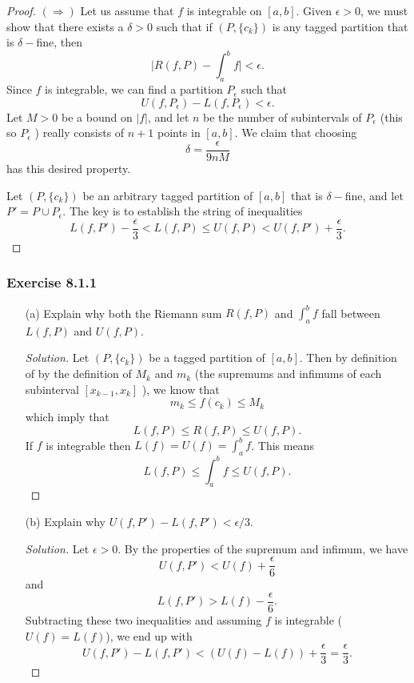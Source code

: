 \begin{proof}
    \( (\Rightarrow)  \) Let us assume that \( f  \) is integrable on \( [a,b]  \). Given \( \epsilon > 0  \), we must show that there exists a \( \delta > 0  \) such that if \( ( P, \{ c_{k } \} ) \) is any tagged partition that is \( \delta- \)fine, then 
    \[  \Big| R(f,P) - \int_{ a }^{ b } f  \Big| < \epsilon. \]
    Since \( f  \) is integrable, we can find a partition \( P_{\epsilon } \) such that 
    \[  U(f, P_{\epsilon }) - L(f, P_{\epsilon })  < \epsilon. \] Let \( M > 0  \) be a bound on \( | f |  \), and let \( n  \) be the number of subintervals of \( P_{\epsilon } \) (this so \( P_{\epsilon }\) ) really consists of \( n + 1  \) points in \( [a,b]  \). We claim that choosing 
    \[  \delta = \frac{ \epsilon  }{ 9nM }  \] has this desired property. 

    Let \( (P, \{ c_{k}    \} ) \) be an arbitrary tagged partition of \( [a,b]  \) that is \( \delta- \)fine, and let \( P' = P \cup P_{\epsilon } \). The key is to establish the string of inequalities 
    \[  L(f,P') - \frac{ \epsilon  }{ 3 }  < L(f,P ) \leq U(f,P) < U(f,P') + \frac{ \epsilon  }{ 3 }.\]
\end{proof}

\subsubsection{Exercise 8.1.1} 
\begin{enumerate}
    \item[(a)] Explain why both the Riemann sum \( R(f,P)  \) and \( \int_{ a }^{ b } f  \) fall between \( L(f,P)  \) and \( U(f,P)  \). 
        \begin{proof}[Solution]
            Let \( (P, \{ c_{k }  \} ) \) be a tagged partition of \( [a,b]  \). Then by definition of by the definition of \( M_{k }  \)  and \( m_{k }   \) (the supremums and infimums  of each subinterval \( [x_{k-1} , x_{k }] \) ), we know that 
            \[  m_{ k } \leq f(c_{ k }  )  \leq M_{k } \] which imply that 
            \[ L(f,P) \leq R(f,P) \leq U(f,P). \]
            If \( f  \) is integrable then \( L(f) = U(f) = \int_{ a }^{ b } f   \). This means 
            \[ L(f,P) \leq \int_{ a }^{ b } f \leq U(f,P).\]
        \end{proof}
        \item[(b)] Explain why \( U(f,P') - L(f, P') < \epsilon / 3.  \)
            \begin{proof}[Solution]
           Let \( \epsilon > 0  \). By the properties of the supremum and infimum, we have 
            \[ U(f,P') < U(f) + \frac{ \epsilon  }{ 6 } \] and 
            \[  L(f,P') > L(f) - \frac{ \epsilon  }{ 6 }. \] Subtracting these two inequalities and assuming \( f  \) is integrable (\( U(f) = L(f) \)), we end up with 
            \[  U(f,P') - L(f,P') < (U(f) - L(f)) + \frac{ \epsilon  }{ 3 } = \frac{ \epsilon  }{ 3 }. \]
            \end{proof}
\end{enumerate}

